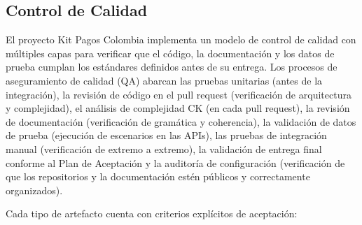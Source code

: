 \subsection{Control de Calidad}

El proyecto Kit Pagos Colombia implementa un modelo de control de calidad con múltiples capas para verificar que el código, la documentación y los datos de prueba cumplan los estándares definidos antes de su entrega. Los procesos de aseguramiento de calidad (QA) abarcan las pruebas unitarias (antes de la integración), la revisión de código en el pull request (verificación de arquitectura y complejidad), el análisis de complejidad CK (en cada pull request), la revisión de documentación (verificación de gramática y coherencia), la validación de datos de prueba (ejecución de escenarios en las APIs), las pruebas de integración manual (verificación de extremo a extremo), la validación de entrega final conforme al Plan de Aceptación y la auditoría de configuración (verificación de que los repositorios y la documentación estén públicos y correctamente organizados).

Cada tipo de artefacto cuenta con criterios explícitos de aceptación:

